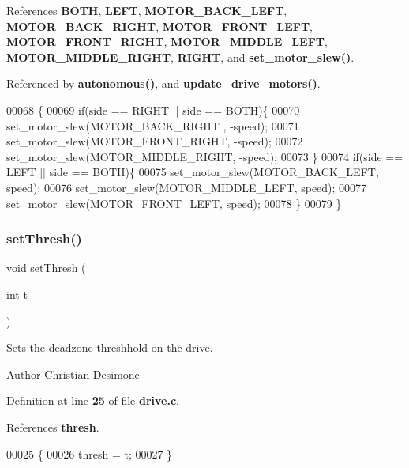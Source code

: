 References \textbf{ B\+O\+TH}, \textbf{ L\+E\+FT}, \textbf{ M\+O\+T\+O\+R\+\_\+\+B\+A\+C\+K\+\_\+\+L\+E\+FT}, \textbf{ M\+O\+T\+O\+R\+\_\+\+B\+A\+C\+K\+\_\+\+R\+I\+G\+HT}, \textbf{ M\+O\+T\+O\+R\+\_\+\+F\+R\+O\+N\+T\+\_\+\+L\+E\+FT}, \textbf{ M\+O\+T\+O\+R\+\_\+\+F\+R\+O\+N\+T\+\_\+\+R\+I\+G\+HT}, \textbf{ M\+O\+T\+O\+R\+\_\+\+M\+I\+D\+D\+L\+E\+\_\+\+L\+E\+FT}, \textbf{ M\+O\+T\+O\+R\+\_\+\+M\+I\+D\+D\+L\+E\+\_\+\+R\+I\+G\+HT}, \textbf{ R\+I\+G\+HT}, and \textbf{ set\+\_\+motor\+\_\+slew()}.



Referenced by \textbf{ autonomous()}, and \textbf{ update\+\_\+drive\+\_\+motors()}.


\begin{DoxyCode}
00068                                            \{
00069   \textcolor{keywordflow}{if}(side == RIGHT || side == BOTH)\{
00070     set_motor_slew(MOTOR_BACK_RIGHT , -speed);
00071     set_motor_slew(MOTOR_FRONT_RIGHT, -speed);
00072     set_motor_slew(MOTOR_MIDDLE_RIGHT, -speed);
00073   \}
00074   \textcolor{keywordflow}{if}(side == LEFT || side == BOTH)\{
00075     set_motor_slew(MOTOR_BACK_LEFT, speed);
00076     set_motor_slew(MOTOR_MIDDLE_LEFT, speed);
00077     set_motor_slew(MOTOR_FRONT_LEFT, speed);
00078   \}
00079 \}
\end{DoxyCode}
\mbox{\label{drive_8c_a53d6e35d53ec3e0b1b1c489d8203f204}} 
\subsubsection{set\+Thresh()}
{\footnotesize\ttfamily void set\+Thresh (\begin{DoxyParamCaption}\item[{int}]{t }\end{DoxyParamCaption})}



Sets the deadzone threshhold on the drive. 

\begin{DoxyAuthor}{Author}
Christian Desimone 
\end{DoxyAuthor}


Definition at line \textbf{ 25} of file \textbf{ drive.\+c}.



References \textbf{ thresh}.


\begin{DoxyCode}
00025                      \{
00026   thresh = t;
00027 \}
\end{DoxyCode}
\mbox{\label{drive_8c_a8224a4626a934d30ed587671b7004bf8}} 
